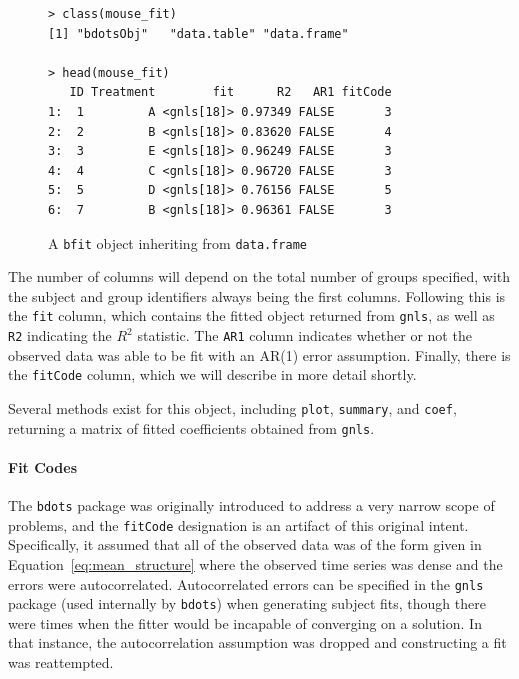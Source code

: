 \documentclass{article}
\newcommand{\xt}{\texttt}%
\begin{document}
\begin{singlespace}
\begin{figure}[H]
\centering
\begin{BVerbatim}
> class(mouse_fit)
[1] "bdotsObj"   "data.table" "data.frame"

> head(mouse_fit)
   ID Treatment        fit      R2   AR1 fitCode
1:  1         A <gnls[18]> 0.97349 FALSE       3
2:  2         B <gnls[18]> 0.83620 FALSE       4
3:  3         E <gnls[18]> 0.96249 FALSE       3
4:  4         C <gnls[18]> 0.96720 FALSE       3
5:  5         D <gnls[18]> 0.76156 FALSE       5
6:  7         B <gnls[18]> 0.96361 FALSE       3
\end{BVerbatim}
\caption{A \xt{bfit} object inheriting from \xt{data.frame}}
\label{fig:bdotsObj}
\end{figure}
\end{singlespace}

The number of columns will depend on the total number of groups specified, with the subject and group identifiers always being the first columns. Following this is the \xt{fit} column, which contains the fitted object returned from \xt{gnls}, as well as \xt{R2} indicating the $R^2$ statistic. The \xt{AR1} column indicates whether or not the observed data was able to be fit with an AR(1) error assumption. Finally, there is the \xt{fitCode} column, which we will describe in more detail shortly.

Several methods exist for this object, including \texttt{plot}, \texttt{summary}, and \texttt{coef}, returning a matrix of fitted coefficients obtained from \texttt{gnls}. 


\paragraph{Fit Codes}\label{sec:fitcode}

The \xt{bdots} package was originally introduced to address a very narrow scope of problems, and the \xt{fitCode} designation is an artifact of this original intent. Specifically, it assumed that all of the observed data was of the form given in Equation~\ref{eq:mean_structure} where the observed time series was dense and the errors were autocorrelated. Autocorrelated errors can be specified in the \xt{gnls} package (used internally by \xt{bdots}) when generating subject fits, though there were times when the fitter would be incapable of converging on  a solution. In that instance, the autocorrelation assumption was dropped and constructing a fit was reattempted.
\end{document}
